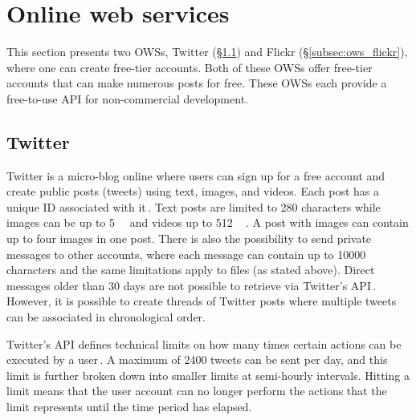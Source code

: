 \section{Online web services}
\label{sec:ows}
This section presents two \gls{OWS}s, Twitter (§\ref{subsec:ows_twitter}) and Flickr (§\ref{subsec:ows_flickr}), where one can create \mbox{free-tier} accounts. Both of these \gls{OWS}s offer \mbox{free-tier} accounts that can make numerous posts for free. These \glspl{OWS} each provide a \mbox{free-to-use} \gls{API} for \mbox{non-commercial} development. 

\subsection{Twitter}
\label{subsec:ows_twitter}
Twitter is a \mbox{micro-blog} online where users can sign up for a free account and create public posts (tweets) using text, images, and videos. Each post has a unique ID associated with it\,\cite{twitterTwitterIDs}. Text posts are limited to \num{280} characters while images can be up to \SI{5}{\mega\byte} and videos up to \SI{512}{\mega\byte}\,\cite{MediaBestPractices}. A post with images can contain up to four images in one post. There is also the possibility to send private messages to other accounts, where each message can contain up to \num{10000} characters and the same limitations apply to files (as stated above). Direct messages older than \num{30} days are not possible to retrieve via Twitter's \gls{API}\,\cite{RetrievingOlder302018}. However, it is possible to create threads of Twitter posts where multiple tweets can be associated in chronological order.

Twitter's \gls{API} defines technical limits on how many times certain actions can be executed by a user\,\cite{UnderstandingTwitterLimits}. A maximum of \num{2400} tweets can be sent per day, and this limit is further broken down into smaller limits at \mbox{semi-hourly} intervals. Hitting a limit means that the user account can no longer perform the actions that the limit represents until the time period has elapsed.

